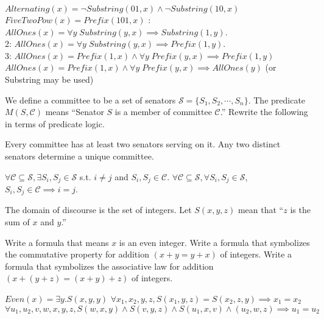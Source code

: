 \documentclass[solution, letterpaper]{cs20inclass}
\begin{document}
\begin{solution}
\subsolution $Alternating(x) = \neg Substring(01, x) \wedge \neg Substring(10, x)$
\subsolution $FiveTwoPow(x) = Prefix(101, x)$
: $AllOnes(x) = \forall y \; Substring(y, x) \implies Substring(1, y)$.\\
2: $AllOnes(x) = \forall y \; Substring(y, x) \implies Prefix(1, y)$.\\
3: $AllOnes(x) = Prefix(1, x) \wedge \forall y \; Prefix(y, x) \implies Prefix(1, y)$
\subsolution $AllOnes(x) = Prefix(1, x) \wedge \forall y \; Prefix(y, x) \implies AllOnes(y)$ (or Substring may be used)

\end{solution}


\problem
We define a committee to be a set of senators $\mathcal{S} = \{S_1,S_2,\cdots,S_n\}$. The predicate $M(S,\mathcal{C})$ means ``Senator $S$ is a member of committee $\mathcal{C}$.'' Rewrite the following in terms of predicate logic.

\subproblem Every committee has at least two senators serving on it.
\subproblem Any two distinct senators determine a unique committee. 

\begin{solution}
\subsolution $\forall \mathcal{C} \subseteq \mathcal{S}, \exists S_i, S_j  \in \mathcal{S} $ s.t. $i \neq j$ and $S_i, S_j \in \mathcal{C}$.
\subsolution $\forall \mathcal{C} \subseteq \mathcal{S}, \forall S_i, S_j \in \mathcal{S}$, $S_i, S_j \in \mathcal{C} \implies i = j$.
\end{solution}

\problem The domain of discourse is the set of integers. Let $S(x, y, z)$ mean that ``$z$ is the sum of $x$ and $y$.''

\subproblem Write a formula that means $x$ is an even integer. 
\subproblem Write a formula that symbolizes the commutative property for addition $(x+y = y +x)$ of integers.
\subproblem Write a formula that symbolizes the associative law for addition\\ $(x + (y + z) = (x + y) + z)$ of integers.

\begin{solution}
\subsolution $Even(x) = \exists y. S(x, y, y)$   
\subsolution $\forall x_1, x_2, y, z, S(x_1, y, z) = S(x_2, z, y) \implies x_1 = x_2$
\subsolution $\forall u_1, u_2, v, w, x, y, z, S(w, x, y) \wedge S(v, y, z) \wedge S(u_1, x, v) \wedge (u_2, w, z) \implies u_1 = u_2$
\end{solution}
\end{document}
